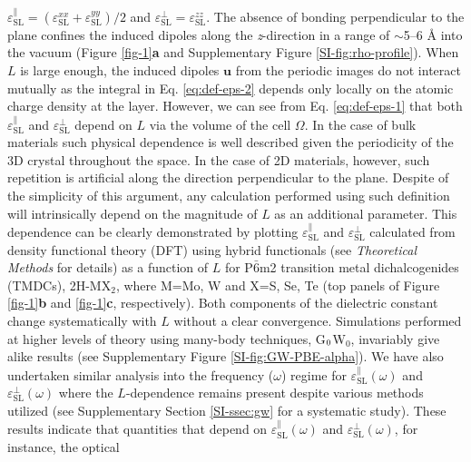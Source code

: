 \documentclass[journal=ancac3,manuscript=article,email=true,hyperref=true,keywords=false]{achemso}
\begin{document}
$\varepsilon_{\mathrm{SL}}^{\parallel} =
(\varepsilon_{\mathrm{SL}}^{xx} + \varepsilon_{\mathrm{SL}}^{yy})/2$
and
$\varepsilon_{\mathrm{SL}}^{\perp} = \varepsilon_{\mathrm{SL}}^{zz}$.
The absence of bonding perpendicular to the plane confines the induced
dipoles along the \textit{z}-direction in a range of 
$\sim{}$5--6 \AA{} into the vacuum (Figure \ref{fig-1}{\textbf a} and
Supplementary Figure \ref{SI-fig:rho-profile}). 
%
%
When $L$ is large
enough, the induced dipoles $\boldsymbol{u}$ from the periodic images
do not interact mutually as the integral in Eq. \ref{eq:def-eps-2}
depends only locally on the atomic charge density at the layer.
However, we can see from Eq. \ref{eq:def-eps-1} that both
$\varepsilon^{\parallel}_{\mathrm{SL}}$ and
$\varepsilon^{\perp}_{\mathrm{SL}}$ depend on $L$ via the volume of
the cell $\Omega$. In the case of bulk materials such physical dependence 
is well described given the periodicity of the 3D crystal throughout the space.  
%
%
%
In the case of 2D materials, however, such repetition is artificial along the direction 
perpendicular to the plane. Despite of the simplicity of this argument,  
any calculation performed using such
definition will intrinsically depend on the magnitude of $L$ as an
additional parameter. This dependence can be clearly demonstrated by
plotting $\varepsilon^{\parallel}_{\mathrm{SL}}$ and
$\varepsilon^{\perp}_{\mathrm{SL}}$ calculated from density functional
theory (DFT) using hybrid functionals (see {\it Theoretical Methods} for details)
as a function of $L$ for P$\bar{6}$m2 transition metal
dichalcogenides (TMDCs), 2H-MX$_{2}$, where M=Mo, W and X=S, Se, Te
(top panels of Figure \ref{fig-1}{\textbf b} and \ref{fig-1}{\textbf c},
respectively). Both components of the dielectric constant 
change systematically with $L$ without a clear convergence. 
%
Simulations performed at higher levels of theory using many-body
techniques, G$_{\rm 0}$W$_{0}$, invariably give alike results (see
Supplementary Figure \ref{SI-fig:GW-PBE-alpha}).  We have also
undertaken similar analysis into the frequency ($\omega$) regime for
$\varepsilon^{\parallel}_{\mathrm{SL}}(\omega)$ and
$\varepsilon^{\perp}_{\mathrm{SL}}(\omega)$ where the $L$-dependence
remains present despite various methods utilized (see Supplementary
Section \ref{SI-ssec:gw} for a systematic study).  These results
indicate that quantities that depend on
$\varepsilon^{\parallel}_{\mathrm{SL}}(\omega)$ and
$\varepsilon^{\perp}_{\mathrm{SL}}(\omega)$, for instance, the optical
\end{document}
